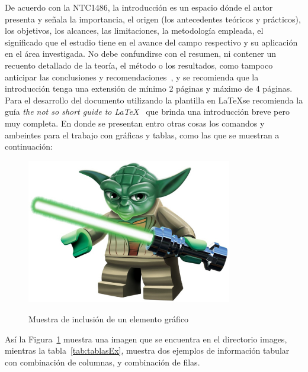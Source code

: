 
De acuerdo con la NTC1486, la introducción es un espacio dónde el autor presenta y señala la importancia, el origen (los antecedentes teóricos y prácticos), los objetivos, los alcances, las limitaciones, la metodología empleada, el significado que el estudio tiene en el avance del campo respectivo y su aplicación en el área investigada. No debe confundirse con el resumen, ni contener un recuento detallado de la teoría, el método o los resultados, como tampoco anticipar las conclusiones y recomendaciones~\cite{NTC14862008}, y se recomienda que la introducción tenga una extensión de mínimo 2 páginas y máximo de 4 páginas.\\

Para el desarrollo del documento utilizando la plantilla en \LaTeX se recomienda la guía \textit{the not so short guide to \LaTeX}~\cite{Oetiker2016} que brinda una introducción breve pero muy completa. En donde se presentan entro otras cosas los comandos y ambeintes para el trabajo con gráficas y tablas, como las que se muestran a continuación:

\begin{figure}[htbp!]
    \caption{Muestra de inclusión de un elemento gráfico}
    \centering
    \includegraphics[width=0.8\textwidth]{Images/ImagenYoda.jpg}
    \label{fig:yoda}
\end{figure}

Así la Figura~\ref{fig:yoda} muestra una imagen que se encuentra en el directorio images, mientras la tabla~\ref{tab:tablasEx}, muestra dos ejemplos de información tabular con combinación de columnas, y combinación de filas.

